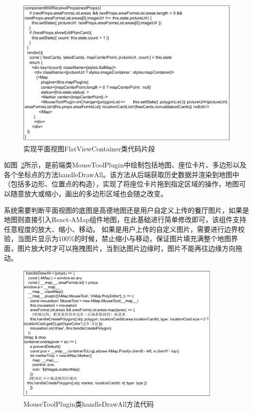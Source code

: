 \begin{figure}[htbp!]
    \centering
    \includegraphics[width=5in]{FIGs/chapter4/12.pdf}
    \caption{实现平面视图FlatViewContainer类代码片段}\label{fig_seat_12}
\end{figure}

如图~\ref{fig_seat_13}所示，是前端类MouseToolPlugin中绘制包括地图、座位卡片、多边形以及各个坐标点的方法handleDrawAll。该方法从后端获取历史数据并渲染到地图中（包括多边形、位置点的构造），实现了将座位卡片拖到指定区域的操作，地图可以随意放大或缩小，画出的多边形区域也会随之改变。

系统需要判断平面视图的底图是高德地图还是用户自定义上传的餐厅图片，如果是地图则直接引入React-AMap组件地图，在此基础进行简单修改即可，该组件支持任意程度的放大、缩小、移动。
如果是用户上传的自定义图片，需要进行边界校验，当图片显示为100\%的时候，禁止缩小与移动，保证图片填充满整个地图界面，图片放大时才可以拖拽图片，当到达图片边缘时，图片不能再往边缘方向拖动。

\begin{figure}[htbp!]
    \centering
    \includegraphics[width=4in]{FIGs/chapter4/13.pdf}
    \caption{MouseToolPlugin类handleDrawAll方法代码}\label{fig_seat_13}
\end{figure}

